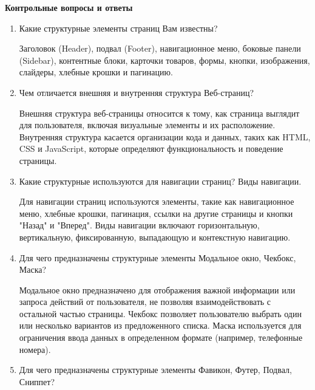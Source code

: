 \noindent
\begin{minipage}{\linewidth}
\end{minipage}
\bigskip

\noindent
\begin{minipage}{\linewidth}
\end{minipage}
\bigskip

\textbf{Контрольные вопросы и ответы}

\begin{enumerate}
    \item Какие структурные элементы страниц Вам известны?

    Заголовок (Header), подвал (Footer), навигационное меню, боковые панели (Sidebar), контентные блоки, карточки товаров, формы, кнопки, изображения, слайдеры, хлебные крошки и пагинацию.
    \item Чем отличается внешняя и внутренняя структура Веб-страниц?

    Внешняя структура веб-страницы относится к тому, как страница выглядит для пользователя, включая визуальные элементы и их расположение. Внутренняя структура касается организации кода и данных, таких как HTML, CSS и JavaScript, которые определяют функциональность и поведение страницы.
    \item Какие структурные используются для навигации страниц? Виды навигации.

    Для навигации страниц используются элементы, такие как навигационное меню, хлебные крошки, пагинация, ссылки на другие страницы и кнопки "Назад" и "Вперед". Виды навигации включают горизонтальную, вертикальную, фиксированную, выпадающую и контекстную навигацию.
    \item Для чего предназначены структурные элементы Модальное окно, Чекбокс, Маска?

    Модальное окно предназначено для отображения важной информации или запроса действий от пользователя, не позволяя взаимодействовать с остальной частью страницы. Чекбокс позволяет пользователю выбрать один или несколько вариантов из предложенного списка. Маска используется для ограничения ввода данных в определенном формате (например, телефонные номера).
    \item Для чего предназначены структурные элементы Фавикон, Футер, Подвал, Сниппет?


\end{enumerate}
